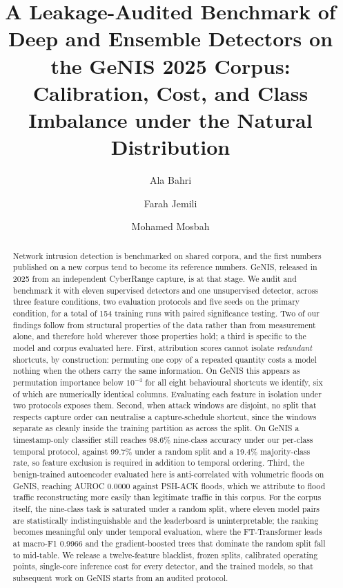 \documentclass[review,12pt]{elsarticle}
\newcommand{\todo}[1]{\textcolor{red}{[TODO: #1]}}
\begin{document}
\begin{frontmatter}

\title{A Leakage-Audited Benchmark of Deep and Ensemble Detectors on the
GeNIS 2025 Corpus: Calibration, Cost, and Class Imbalance under the
Natural Distribution}

\author[1]{Ala Bahri}
\author[1]{Farah Jemili}
\author[2]{Mohamed Mosbah}
\affiliation[1]{organization={\todo{affiliation 1}}}
\affiliation[2]{organization={\todo{affiliation 2}}}

\begin{abstract}
Network intrusion detection is benchmarked on shared corpora, and the first numbers
published on a new corpus tend to become its reference numbers. GeNIS, released in 2025
from an independent CyberRange capture, is at that stage. We audit and benchmark it with
eleven supervised detectors and one unsupervised detector, across three feature
conditions, two evaluation protocols and five seeds on the primary condition, for a total
of 154 training runs with paired significance testing. Two of our findings follow from
structural properties of the data rather than from measurement alone, and therefore hold
wherever those properties hold; a third is specific to the model and corpus evaluated
here. First, attribution scores cannot isolate \emph{redundant} shortcuts, by
construction: permuting one copy of a repeated quantity costs a model nothing when the
others carry the same information. On GeNIS this appears as permutation importance below
$10^{-4}$ for all eight behavioural shortcuts we identify, six of which are numerically
identical columns. Evaluating each feature in isolation under two protocols exposes them.
Second, when attack windows are disjoint, no split that respects capture order can
neutralise a capture-schedule shortcut, since the windows separate as cleanly inside the
training partition as across the split. On GeNIS a timestamp-only classifier still reaches
98.6\% nine-class accuracy under our per-class temporal protocol, against 99.7\% under a
random split and a 19.4\% majority-class rate, so feature exclusion is required in
addition to temporal ordering. Third, the benign-trained autoencoder evaluated here is
anti-correlated with volumetric floods on GeNIS, reaching AUROC 0.0000 against PSH-ACK
floods, which we attribute to flood traffic reconstructing more easily than legitimate
traffic in this corpus. For the corpus itself, the nine-class task is saturated under a
random split, where eleven model pairs are statistically indistinguishable and the
leaderboard is uninterpretable; the ranking becomes meaningful only under temporal
evaluation, where the FT-Transformer leads at macro-F1 0.9966 and the gradient-boosted
trees that dominate the random split fall to mid-table. We release a twelve-feature
blacklist, frozen splits, calibrated operating points, single-core inference cost for
every detector, and the trained models, so that subsequent work on GeNIS starts from an
audited protocol.
\end{abstract}


\end{frontmatter}
\end{document}
